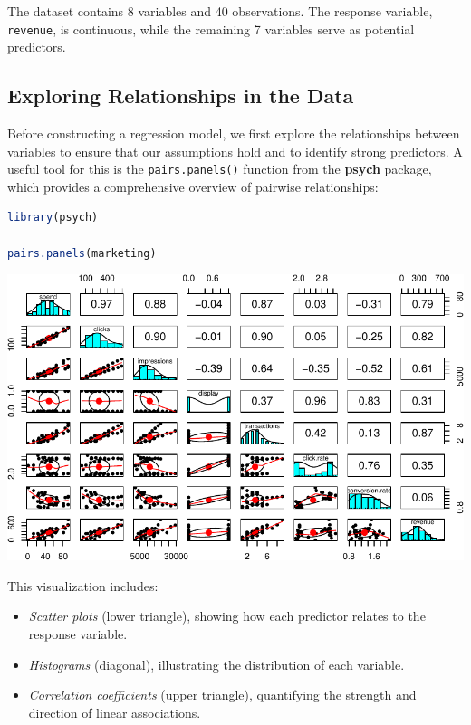 \documentclass[
]{book}
\newcommand{\passthrough}[1]{#1}
\providecommand{\tightlist}{%
  \setlength{\itemsep}{0pt}\setlength{\parskip}{0pt}}
\theoremstyle{definition}
\theoremstyle{definition}
\theoremstyle{definition}
\theoremstyle{definition}
\theoremstyle{remark}
\begin{document}
The dataset contains 8 variables and 40 observations. The response variable, \passthrough{\lstinline!revenue!}, is continuous, while the remaining 7 variables serve as potential predictors.

\subsection*{Exploring Relationships in the Data}\label{exploring-relationships-in-the-data}

Before constructing a regression model, we first explore the relationships between variables to ensure that our assumptions hold and to identify strong predictors. A useful tool for this is the \passthrough{\lstinline!pairs.panels()!} function from the \textbf{psych} package, which provides a comprehensive overview of pairwise relationships:

\begin{lstlisting}[language=R]
library(psych)

pairs.panels(marketing)
\end{lstlisting}

\begin{center}\includegraphics[width=1\linewidth]{regression_files/figure-latex/unnamed-chunk-2-1} \end{center}

This visualization includes:

\begin{itemize}
\tightlist
\item
  \emph{Scatter plots} (lower triangle), showing how each predictor relates to the response variable.\\
\item
  \emph{Histograms} (diagonal), illustrating the distribution of each variable.\\
\item
  \emph{Correlation coefficients} (upper triangle), quantifying the strength and direction of linear associations.
\end{itemize}
\end{document}
